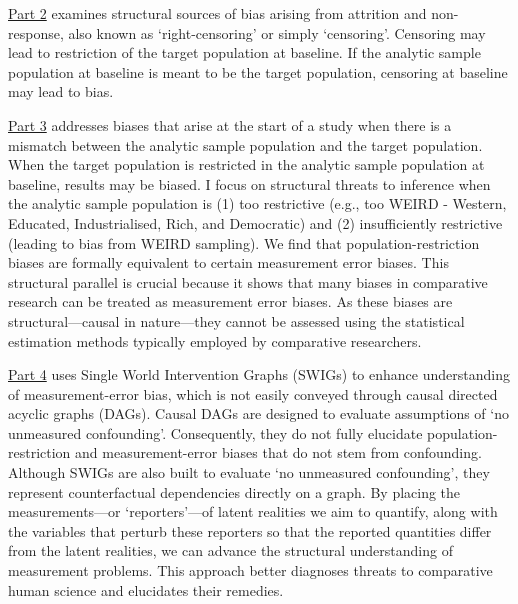 \documentclass[
  single column]{article}
\begin{document}
\hyperref[id-sec-2]{Part 2} examines structural sources of bias arising
from attrition and non-response, also known as `right-censoring' or
simply `censoring'. Censoring may lead to restriction of the target
population at baseline. If the analytic sample population at baseline is
meant to be the target population, censoring at baseline may lead to
bias.

\hyperref[id-sec-3]{Part 3} addresses biases that arise at the start of
a study when there is a mismatch between the analytic sample population
and the target population. When the target population is restricted in
the analytic sample population at baseline, results may be biased. I
focus on structural threats to inference when the analytic sample
population is (1) too restrictive (e.g., too WEIRD - Western, Educated,
Industrialised, Rich, and Democratic) and (2) insufficiently restrictive
(leading to bias from WEIRD sampling). We find that
population-restriction biases are formally equivalent to certain
measurement error biases. This structural parallel is crucial because it
shows that many biases in comparative research can be treated as
measurement error biases. As these biases are structural---causal in
nature---they cannot be assessed using the statistical estimation
methods typically employed by comparative researchers.

\hyperref[id-sec-4]{Part 4} uses Single World Intervention Graphs
(SWIGs) to enhance understanding of measurement-error bias, which is not
easily conveyed through causal directed acyclic graphs (DAGs). Causal
DAGs are designed to evaluate assumptions of `no unmeasured
confounding'. Consequently, they do not fully elucidate
population-restriction and measurement-error biases that do not stem
from confounding. Although SWIGs are also built to evaluate `no
unmeasured confounding', they represent counterfactual dependencies
directly on a graph. By placing the measurements---or `reporters'---of
latent realities we aim to quantify, along with the variables that
perturb these reporters so that the reported quantities differ from the
latent realities, we can advance the structural understanding of
measurement problems. This approach better diagnoses threats to
comparative human science and elucidates their remedies.
\end{document}
